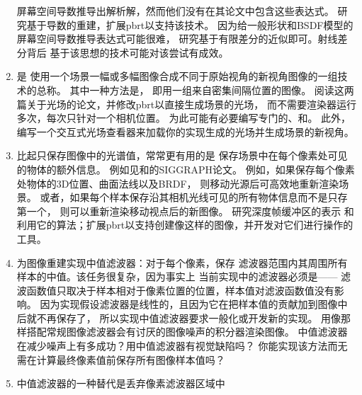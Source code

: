 \begin{enumerate}
            屏幕空间导数推导出解析解，然而他们没有在其论文中包含这些表达式。
            研究基于导数的重建，扩展pbrt以支持该技术。
            因为给一般形状和BSDF模型的屏幕空间导数推导表达式可能很难，
            研究基于有限差分的近似即可。射线差分背后
            基于该思想的技术可能对该尝试有成效。
      \item \circlethree {}是
            使用一个场景一幅或多幅图像合成不同于原始视角的新视角图像的一组技术的总称。
            其中一种方法是，
            即用一组来自密集间隔位置的图像\citep{10.1145/237170.237199,10.1145/237170.237200}。
            阅读这两篇关于光场的论文，并修改pbrt以直接生成场景的光场，
            而不需要渲染器运行多次，每次只针对一个相机位置。
            为此可能有必要编写专门的、和。
            此外，编写一个交互式光场查看器来加载你的实现生成的光场并生成场景的新视角。
      \item \circlethree 比起只保存图像中的光谱值，常常更有用的是
            保存场景中在每个像素处可见的物体的额外信息。
            例如见\citet{10.1145/325334.325247}和\citet{10.1145/97879.97901}的SIGGRAPH论文。
            例如，如果保存每个像素处物体的3D位置、曲面法线以及BRDF，
            则移动光源后可高效地重新渲染场景\citep{10.1145/344779.344938}。
            或者，如果每个样本保存沿其相机光线可见的所有物体信息而不是只存第一个，
            则可以重新渲染移动视点后的新图像\citep{10.1145/280814.280882}。
            研究深度帧缓冲区的表示
            和利用它的算法；扩展pbrt以支持创建像这样的图像，并开发对它们进行操作的工具。
      \item \circletwo 为图像重建实现中值滤波器：对于每个像素，保存
            滤波器范围内其周围所有样本的中值。该任务很复杂，因为事实上
            当前实现中的滤波器必须是——
            滤波函数值只取决于样本相对于像素位置的位置，样本值对滤波函数值没有影响。
            因为实现假设滤波器是线性的，且因为它在把样本值的贡献加到图像中后就不再保存了，
            所以实现中值滤波器要求一般化或开发新的实现。
            用像那样搭配常规图像滤波器会有讨厌的图像噪声的积分器渲染图像。
            中值滤波器在减少噪声上有多成功？用中值滤波器有视觉缺陷吗？
            你能实现该方法而无需在计算最终像素值前保存所有图像样本值吗？
      \item \circletwo 中值滤波器的一种替代是丢弃像素滤波器区域中

\end{enumerate}
